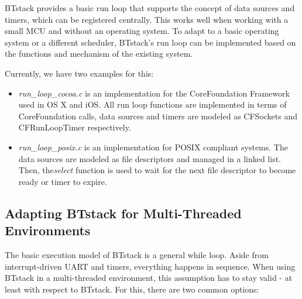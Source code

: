 \documentclass[a4paper,titlepage,oneside,12pt]{amsart} %
\begin{document}
BTstack provides a basic run loop that supports the concept of data sources and timers, which can be registered centrally. This works well when working with a small MCU and without an operating system.
To adapt to a basic operating system or a different scheduler, BTstack's run loop can be implemented based on the functions and mechanism of the existing system. 

Currently, we have two examples for this:
\begin{itemize}
\item \emph{run\_loop\_cocoa.c} is an implementation for the CoreFoundation Framework used in OS X and iOS. All run loop functions are implemented in terms of CoreFoundation calls, data sources and timers are modeled as CFSockets and CFRunLoopTimer respectively. 
\item \emph{run\_loop\_posix.c} is an implementation for POSIX compliant systems. The data sources are modeled as file descriptors and managed in a linked list. Then, the\emph{select} function is used to wait for the next file descriptor to become ready or timer to expire. 
\end{itemize}

\subsection{Adapting BTstack for Multi-Threaded Environments}
\label{section:multithreading}

The basic execution model of BTstack is a general while loop. Aside from interrupt-driven UART and timers, everything happens in sequence. 
When using BTstack in a multi-threaded environment,  this assumption has to stay valid - at least with respect to BTstack. For this, there are two common options:
\end{document}
